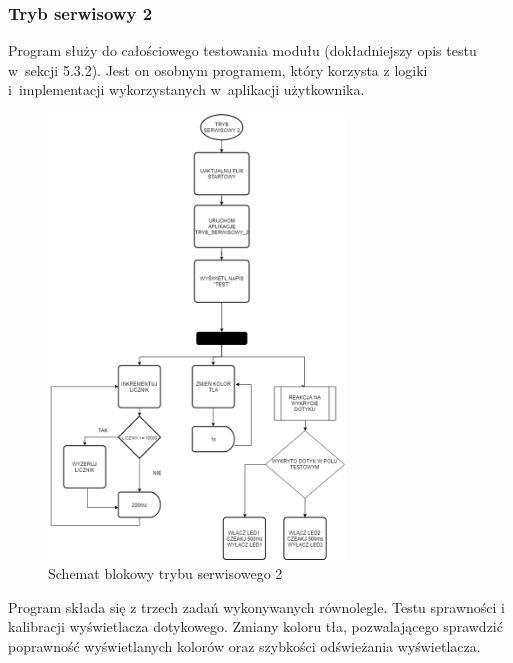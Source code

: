 \documentclass[12pt, eng, twoside, openany, final]{mgr}
\begin{document}
                    \subsubsection{Tryb serwisowy 2}
                    Program służy do całościowego testowania modułu (dokładniejszy opis testu w~sekcji 5.3.2). Jest on osobnym programem, który korzysta z logiki i~implementacji wykorzystanych w~aplikacji użytkownika.
                        \begin{figure}[H]
                        \begin{center}
                            \includegraphics[width=0.7\textwidth]{t2.png}
                            \caption{Schemat blokowy trybu serwisowego 2} \label{fig:serT2}
                        \end{center}
                        \end{figure}
                    Program składa się z trzech zadań wykonywanych równolegle. Testu sprawności i kalibracji wyświetlacza dotykowego. Zmiany koloru tła, pozwalającego sprawdzić poprawność wyświetlanych kolorów oraz szybkości odświeżania wyświetlacza.
                        \newpage
                        
\end{document}
